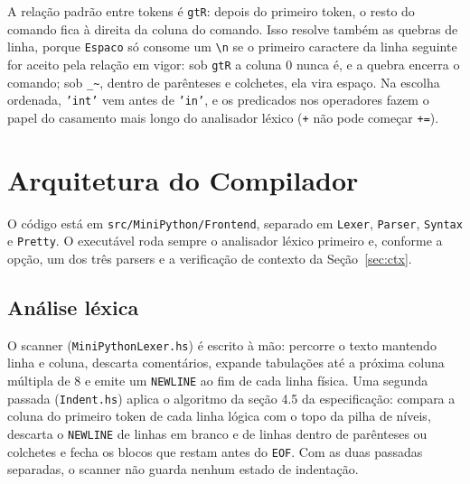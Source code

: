 \documentclass[12pt,a4paper]{article}
\begin{document}
A relação padrão entre tokens é \texttt{gtR}: depois do primeiro token,
o resto do comando fica à direita da coluna do comando. Isso resolve
também as quebras de linha, porque \texttt{Espaco} só consome um
\texttt{\textbackslash n} se o primeiro caractere da linha seguinte for
aceito pela relação em vigor: sob \texttt{gtR} a coluna 0 nunca é, e a
quebra encerra o comando; sob \texttt{\_\textasciitilde}, dentro de
parênteses e colchetes, ela vira espaço. Na escolha ordenada,
\texttt{'int'} vem antes de \texttt{'in'}, e os predicados nos
operadores fazem o papel do casamento mais longo do analisador léxico
(\texttt{+} não pode começar \texttt{+=}).


\section{Arquitetura do Compilador}

O código está em \texttt{src/MiniPython/Frontend}, separado em
\texttt{Lexer}, \texttt{Parser}, \texttt{Syntax} e \texttt{Pretty}. O
executável roda sempre o analisador léxico primeiro e, conforme a opção,
um dos três parsers e a verificação de contexto da Seção~\ref{sec:ctx}.

\subsection{Análise léxica}

O scanner (\texttt{MiniPythonLexer.hs}) é escrito à mão: percorre o
texto mantendo linha e coluna, descarta comentários, expande tabulações
até a próxima coluna múltipla de 8 e emite um \texttt{NEWLINE} ao fim de
cada linha física. Uma segunda passada (\texttt{Indent.hs}) aplica o
algoritmo da seção 4.5 da especificação: compara a coluna do primeiro
token de cada linha lógica com o topo da pilha de níveis, descarta o
\texttt{NEWLINE} de linhas em branco e de linhas dentro de parênteses ou
colchetes e fecha os blocos que restam antes do \texttt{EOF}. Com as duas
passadas separadas, o scanner não guarda nenhum estado de indentação.
\end{document}
